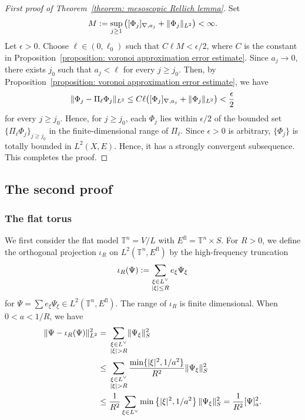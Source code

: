 \documentclass[a4paper,oneside,12pt]{amsart}
\theoremstyle{plain}
\theoremstyle{definition}
\theoremstyle{remark}
\DeclarePairedDelimiter{\abs}{\lvert}{\rvert}
\DeclarePairedDelimiter{\norm}{\lVert}{\rVert}
\DeclarePairedDelimiter{\seminorm}{\lbrack}{\rbrack}
\newcommand{\flattorus}{\mathbb{T}^n}
\newcommand{\Lattice}{L}
\newcommand{\duallattice}[1]{#1^{\vee}}
\newcommand{\Ltwonorm}[2][L^2]{\norm{#2}_{#1}}
\newcommand{\mesoscopicseminorm}[2][a]{\seminorm{#2}_{#1}}
\newcommand{\mesoscopicdifferenceseminorm}[2][a]{\seminorm{#2}_{\nabla,#1}}
\newcommand{\flatmodel}[1]{#1^{\mathrm{fl}}}
\begin{document}
\begin{proof}[First proof of Theorem~\ref{theorem: mesoscopic Rellich lemma}]
  Set
  \begin{equation}
    M := \sup_{j \ge 1} \left( \mesoscopicdifferenceseminorm[a_j]{\Phi_j} + \Ltwonorm{\Phi_j} \right) < \infty.
  \end{equation}
  Let $\epsilon > 0$.
  Choose $\ell \in (0,\ell_0)$ such that $C \ell M < \epsilon / 2$, where $C$ is the constant in Proposition~\ref{proposition: voronoi approximation error estimate}.
  Since $a_j \to 0$, there exists $j_0$ such that $a_j < \ell$ for every $j \ge j_0$.
  Then, by Proposition~\ref{proposition: voronoi approximation error estimate}, we have
  \begin{equation}
    \Ltwonorm{\Phi_j - \Pi_{\ell} \Phi_j} \le C \ell \bigl( \mesoscopicdifferenceseminorm[a_j]{\Phi_j} + \Ltwonorm{\Phi_j} \bigr) < \frac{\epsilon}{2}
  \end{equation}
  for every $j \ge j_0$.
  Hence, for $j \ge j_0$, each $\Phi_j$ lies within $\epsilon/2$ of the bounded set $\{\Pi_\ell \Phi_j\}_{j \ge j_0}$ in the finite-dimensional range of $\Pi_\ell$.
  Since $\epsilon > 0$ is arbitrary, $\{\Phi_j\}$ is totally bounded in $L^2(X,E)$.
  Hence, it has a strongly convergent subsequence.
  This completes the proof.
\end{proof}

\subsection{The second proof}

\subsubsection{The flat torus}

We first consider the flat model $\flattorus = V/\Lattice$ with $\flatmodel{E} = \flattorus \times S$.
For $R > 0$, we define the orthogonal projection $\iota_R$ on $L^2(\flattorus,\flatmodel{E})$ by the high-frequency truncation
\begin{equation}
  \iota_R(\Psi) := \sum_{\substack{\xi \in \duallattice{\Lattice} \\ \abs{\xi} \le R}} e_{\xi} \Psi_{\xi}
\end{equation}
for $\Psi = \sum e_{\xi} \Psi_{\xi} \in L^2(\flattorus,\flatmodel{E})$.
The range of $\iota_R$ is finite dimensional.
When $0 < a < 1/R$, we have
\begin{equation}
  \begin{aligned}
  \Ltwonorm{\Psi - \iota_R(\Psi)}^2 ={}& \sum_{\substack{\xi \in \duallattice{\Lattice} \\ \abs{\xi} > R}} \norm{\Psi_{\xi}}_S^2 \\
  \le{}& \sum_{\substack{\xi \in \duallattice{\Lattice} \\ \abs{\xi} > R}} \frac{\min\{\abs{\xi}^2, 1/a^2\}}{R^2} \norm{\Psi_{\xi}}_S^2 \\
  \le{}& \frac{1}{R^2} \sum_{\xi \in \duallattice{\Lattice}} \min \left\{ \abs{\xi}^2, 1/a^2 \right\} \norm{\Psi_{\xi}}_S^2 = \frac{1}{R^2} \mesoscopicseminorm{\Psi}^2.
  \end{aligned}
\end{equation}
\end{document}
